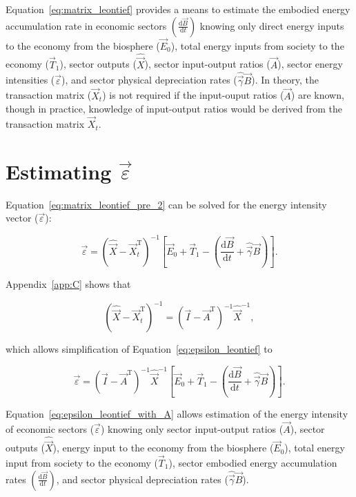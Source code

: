 Equation~\ref{eq:matrix_leontief} provides a means to 
estimate the embodied energy accumulation rate
in economic sectors $\left(\frac{\mathrm{d}\vec{B}}{\mathrm{d}t}\right)$ 
knowing only 
direct energy inputs to the economy from the biosphere ($\vec{E}_{0}$), 
total energy inputs from society to the economy ($\vec{T}_{1}$),
sector outputs ($\hat{\vec{X}}$), 
sector input-output ratios ($\vec{A}$), 
sector energy intensities ($\vec{\varepsilon}$), 
and sector physical depreciation rates ($\hat{\vec{\gamma}}\vec{B}$). 
In theory, the transaction matrix ($\vec{X}_{t}$) is not required 
if the input-ouput ratios ($\vec{A}$) are known, 
though in practice, knowledge of input-output ratios 
would be derived from the transaction matrix $\vec{X}_{t}$.


\section{Estimating $\vec{\varepsilon}$}

Equation~\ref{eq:matrix_leontief_pre_2} can be solved 
for the energy intensity vector ($\vec{\varepsilon}$):

\begin{equation} \label{eq:epsilon_leontief}
	\vec{\varepsilon} 
	= {(\hat{\vec{X}} - \vec{X}_{t}^{\mathrm{T}})}^{-1}
		\left[\vec{E}_{0}
			 	+ \vec{T}_{1}
				- \left(\frac{\mathrm{d}\vec{B}}{\mathrm{d}t} 
				+ \hat{\vec{\gamma}}\vec{B}\right)
		\right].
\end{equation}

\noindent{}Appendix~\ref{app:C} shows that 

\begin{equation} \label{eq:Xdifference2_inverse}
	{\left(
		\hat{\vec{X}} 
		- \vec{X}_{t}^{\mathrm{T}}
		\right)}^{-1} 
	= {(\vec{I} - \vec{A}^{\mathrm{T}})}^{-1}\hat{\vec{X}}^{-1},
\end{equation}

\noindent{}which allows simplification 
of Equation~\ref{eq:epsilon_leontief} to

\begin{equation} \label{eq:epsilon_leontief_with_A}
	\vec{\varepsilon} 
	= {(\vec{I} - \vec{A}^{\mathrm{T}})}^{-1}\hat{\vec{X}}^{-1}
		\left[\vec{E}_{0} 
				+ \vec{T}_{1} 
				- \left(\frac{\mathrm{d}\vec{B}}{\mathrm{d}t} 
				+ \hat{\vec{\gamma}}\vec{B}\right)
		\right].
\end{equation}

\noindent{}Equation~\ref{eq:epsilon_leontief_with_A} allows estimation 
of the energy intensity 
of economic sectors ($\vec{\varepsilon}$) 
knowing only 
sector input-output ratios ($\vec{A}$), 
sector outputs ($\hat{\vec{X}}$), 
energy input to the economy from the biosphere ($\vec{E}_{0}$), 
total energy input from society to the economy ($\vec{T}_{1}$),
sector embodied energy accumulation rates $\left(\frac{\mathrm{d}\vec{B}}{\mathrm{d}t}\right)$,
and sector physical depreciation rates ($\hat{\vec{\gamma}}\vec{B}$).


